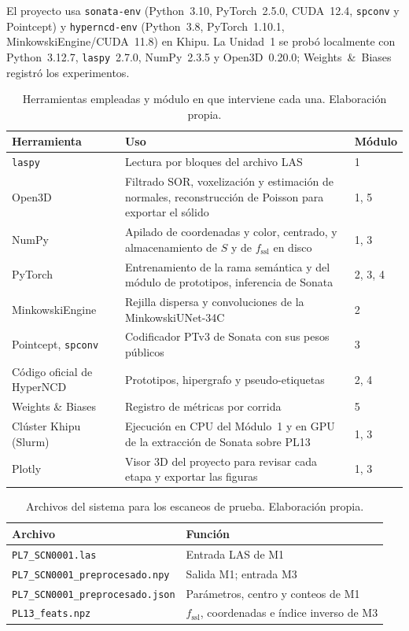 El proyecto usa \texttt{sonata-env} (Python~3.10, PyTorch~2.5.0, CUDA~12.4,
\texttt{spconv} y Pointcept) y \texttt{hyperncd-env} (Python~3.8,
PyTorch~1.10.1, MinkowskiEngine/CUDA~11.8) en Khipu. La Unidad~1 se probó
localmente con Python~3.12.7, \texttt{laspy}~2.7.0, NumPy~2.3.5 y Open3D~0.20.0;
Weights~\&~Biases registró los experimentos.

\begin{table}[!htbp]
\centering
{}
\caption[Herramientas por módulo]{Herramientas empleadas y módulo en que interviene cada una.
Elaboración propia.}
\label{tab:herramientas}
\begin{tabularx}{\linewidth}{@{}>{\raggedright\arraybackslash\hsize=0.54\hsize}X>{\raggedright\arraybackslash\hsize=1.46\hsize}Xl@{}}
\toprule
\textbf{Herramienta} & \textbf{Uso} & \textbf{Módulo} \\
\midrule
\texttt{laspy} & Lectura por bloques del archivo LAS & 1 \\
Open3D & Filtrado SOR, voxelización y estimación de normales, reconstrucción de Poisson para exportar el sólido & 1, 5 \\
NumPy & Apilado de coordenadas y color, centrado, y almacenamiento de $S$ y de $f_{\mathrm{ssl}}$ en disco & 1, 3 \\
PyTorch & Entrenamiento de la rama semántica y del módulo de prototipos, inferencia de Sonata & 2, 3, 4 \\
MinkowskiEngine & Rejilla dispersa y convoluciones de la MinkowskiUNet-34C & 2 \\
Pointcept, \texttt{spconv} & Codificador PTv3 de Sonata con sus pesos públicos & 3 \\
Código oficial de HyperNCD & Prototipos, hipergrafo y pseudo-etiquetas & 2, 4 \\
Weights \& Biases & Registro de métricas por corrida & 5 \\
Clúster Khipu (Slurm) & Ejecución en CPU del Módulo~1 y en GPU de la extracción de Sonata sobre PL13 & 1, 3 \\
Plotly & Visor 3D del proyecto para revisar cada etapa y exportar las figuras & 1, 3 \\
\bottomrule
\end{tabularx}
\end{table}

\begin{table}[!htbp]
\centering
{}
\caption[Archivos del sistema]{Archivos del sistema para los escaneos de prueba. Elaboración propia.}
\label{tab:archivos}
\begin{tabularx}{\linewidth}{@{}l>{\raggedright\arraybackslash}X@{}}
\toprule
\textbf{Archivo} & \textbf{Función} \\
\midrule
\texttt{PL7\_SCN0001.las} & Entrada LAS de M1 \\
\texttt{PL7\_SCN0001\_preprocesado.npy} & Salida M1; entrada M3 \\
\texttt{PL7\_SCN0001\_preprocesado.json} & Parámetros, centro y conteos de M1 \\
\texttt{PL13\_feats.npz} & $f_{\mathrm{ssl}}$, coordenadas e índice inverso de M3 \\
\bottomrule
\end{tabularx}
\end{table}


